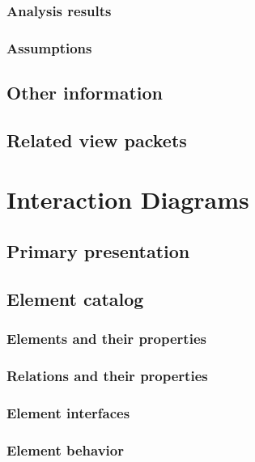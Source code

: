 \documentclass[a4paper,10pt]{report}
\begin{document}
\subsubsection{Analysis results}

\subsubsection{Assumptions}

\subsection{Other information}

\subsection{Related view packets}



\section{Interaction Diagrams}

\subsection{Primary presentation}

\subsection{Element catalog}

\subsubsection{Elements and their properties}

\subsubsection{Relations and their properties}

\subsubsection{Element interfaces}

\subsubsection{Element behavior}
\end{document}
